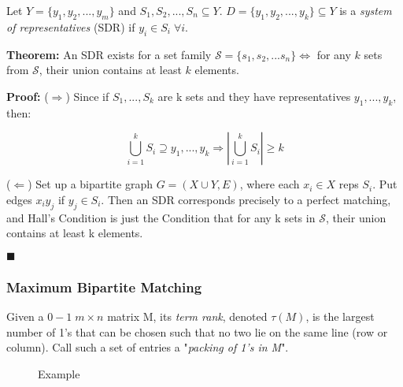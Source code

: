 \documentclass[11pt, letterpaper, oneside]{article}
\begin{document}
Let $Y = \{y_1, y_2, ..., y_m\}$ and $S_1, S_2, ..., S_n \subseteq Y$. $D = \{y_1, y_2, ..., y_k \} \subseteq Y$ is a \textit{system of representatives} (SDR) if $y_i \in S_i \; \forall i$.

\textbf{Theorem:} An SDR exists for a set family $\mathcal{S} = \{s_1, s_2, ... s_n\} \Leftrightarrow$ for any $k$ sets from $\mathcal{S}$, their union contains at least $k$ elements.

\textbf{Proof:}
($\Rightarrow$) Since if $S_1, ..., S_k$ are k sets and they have representatives $y_1, ..., y_k$, then:

$$ \bigcup_{i=1}^k S_i \supseteq {y_1, ..., y_k} \Rightarrow |\bigcup_{i=1}^k S_i| \geq k$$

($\Leftarrow$) Set up a bipartite graph $G = (X \cup Y, E)$, where each $x_i \in X$ reps $S_i$. Put edges $x_i y_j$ if $y_j \in S_i$. Then an SDR corresponds precisely to a perfect matching, and Hall's Condition is just the Condition that for any k sets in $\mathcal{S}$, their union contains at least k elements.

{\hfill $\blacksquare$}

\subsubsection{Maximum Bipartite Matching}

Given a $0-1 \; m \times n$ matrix M, its \textit{term rank}, denoted $\tau(M)$, is the largest number of 1's that can be chosen such that no two lie on the same line (row or column). Call such a set of entries a "\textit{packing of 1's in M}".

\begin{wrapfigure}{r}{0.23\textwidth}
	\vspace*{-0.5cm}
	\caption*{Example}
	\vspace*{-1cm}
\end{wrapfigure}
\end{document}
